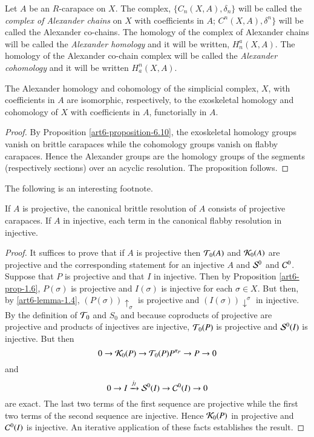 \begin{definition}\label{art6-definition-7.4}
Let $A$ be an $R$-carapace on $X$. The complex, $\{C_{n}(X, A), \delta_{n}\}$ will be called the \textit{complex of Alexander chains} on $X$ with coefficients in $A$; $C^{n}(X, A), \delta^{n}\}$ will be called the Alexander co-chains. The homology of the complex of Alexander chains will be called the \textit{Alexander homology} and it will be written, $H_{n}^{a}(X, A)$. The homology of the Alexander co-chain complex will be called the \textit{Alexander cohomology} and it will be written $H_{a}^{n}(X, A)$. 
\end{definition}

\begin{prop}\label{art6-proposition-7.5}
The Alexander homology and cohomology of the simplicial complex, $X$, with coefficients in $A$ are isomorphic, respectively, to the exoskeletal homology and cohomology of $X$ with coefficients in $A$, functorially in $A$.
\end{prop}

\begin{proof}
By Proposition \ref{art6-proposition-6.10}, the exoskeletal homology groups vanish on brittle carapaces while the cohomology groups vanish on flabby carapaces. Hence the Alexander groups are the homology groups of the segments (respectively sections) over an acyclic resolution. The proposition follows.
\end{proof}

The following is an interesting footnote.

\begin{prop}\label{art6-proposition-7.6}
If $A$ is projective, the canonical brittle resolution of $A$ consists of projective carapaces. If $A$ in injective, each term in the canonical flabby resolution in injective.
\end{prop}

\begin{proof}
It suffices to prove that if $A$ is projective then $\mathcal{T}_{0}(A)$ and $\mathcal{K}_{0}(A)$ are projective and the corresponding statement for an injective $A$ and $\mathcal{S}^{0}$ and $\mathcal{C}^{0}$. Suppose that $P$ is projective and that $I$ in injective. Then by Proposition \ref{art6-prop-1.6}, $P(\sigma)$ is projective and $I(\sigma)$ is injective for each $\sigma \in X$. But then, by \ref{art6-lemma-1.4}, $(P(\sigma))\uparrow_{\sigma}$ is projective and $(I(\sigma))\downarrow^{\sigma}$ in injective. By the definition of $\mathcal{T}_{0}$ and $S_{0}$ and because coproducts of projective are projective and products of injectives are injective, $\mathcal{T}_{0}(P)$ is projective and $\mathcal{S}^{0}(I)$ is injective. But then
$$
0 \rightarrow \mathcal{K}_{0}(P) \rightarrow \mathcal{T}_{0}(P) P^{\pi_{P}} \rightarrow P \rightarrow 0
$$
and
$$
0 \rightarrow I \xrightarrow{j_{I}} \mathcal{S}^{0}(I) \rightarrow \mathcal{C}^{0}(I)\rightarrow 0
$$
are exact. The last two terms of the first sequence are projective while the first two terms of the second sequence are injective. Hence $\mathcal{K}_{0}(P)$ in projective and $\mathcal{C}^{0}(I)$ is injective. An iterative application of these facts establishes the result.
\end{proof}

